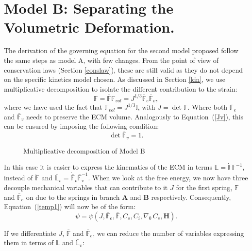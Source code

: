 \documentclass[runningheads]{llncs}
\newcommand{\F}{\ensuremath{\mathbb{F}}}
\newcommand{\LL}{\ensuremath{\mathbb{L}}}
\begin{document}
\section{Model B: Separating the Volumetric Deformation.}
\label{modelB}
The derivation of the governing equation for the second model proposed follow the same steps as model A, with few changes. From the point of view of conservation laws (Section \ref{conslaw}), these are still valid as they do not depend on the specific kinetics model chosen. As discussed in Section \ref{kin}, we use multiplicative decomposition to isolate the different contribution to the strain:
\begin{equation}
\F= \bar{\F} \F_{vol}= J^{1/3} \bar{\F}_e \bar{\F}_v,\label{mol2}
\end{equation}
where we have used the fact that $\F_{vol}=J^{1/3}\mathbb{I}$, with $J=\det \F$. Where both $\bar{\F}_e$  and $\bar{\F}_v$ needs to preserve the ECM volume. Analogously to Equation~(\ref{Jv}), this can be ensured by imposing the following condition:
\begin{equation}
\det \bar{\F}_v = 1.
\end{equation}
\begin{figure}
	\Large
	\def\svgwidth{1\linewidth}
	
	\caption{Multiplicative decomposition of Model B}
\end{figure}

In this case it is easier to express the kinematics of the ECM in terms $\LL=\dot{\F}\F^{-1}$, instead of $\dot{\F}$ and $\bar{\LL}_v=\dot{\bar{\F}}_v\bar{\F}_v^{-1}$. When we look at the free energy, we now have three decouple mechanical variables that can contribute to it $J$ for the first spring, $\bar{\F}$ and $\bar{\F}_e$ on due to the springs in branch $\mathbf{A}$ and $\mathbf{B}$ respectively. Consequently, Equation~(\ref{temp1}) will now be of the form:
\begin{equation}
\psi = \psi (J,\bar{\F}_e, \bar{\F}, C_s, C_i, \nabla_0 \,C_s,\mathbf{H}).\label{aptemp1}
\end{equation}

If we differentiate $J$, $\bar{\F}$ and $\bar{\F}_e$, we can reduce the number of variables expressing them in terms of $\LL$ and $\bar{\LL}_v$:
\end{document}
